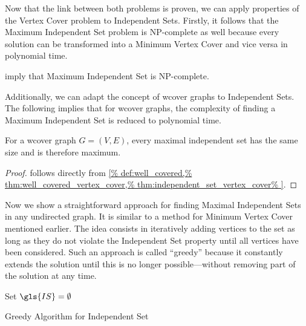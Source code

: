 Now that the link between both problems is proven, we can apply 
properties of the Vertex Cover problem to Independent Sets. Firstly,
it follows that the Maximum Independent Set problem is NP-complete as 
well because every solution can be transformed into a Minimum Vertex
Cover and vice versa in polynomial time.

\begin{theorem}
  \label{thm:maximum_independent_set_complexity}
   imply that Maximum Independent Set
  is NP-complete.
\end{theorem}

Additionally, we can adapt the concept of \gls{wcover} graphs to
Independent Sets. The following
 implies that for
\gls{wcover} graphs, the complexity of finding a Maximum Independent
Set is reduced to polynomial time.

\begin{theorem}
  \label{thm:well_covered_independent_set}
  For a \gls{wcover} graph \(G=(V,E)\), every maximal independent set
  has the same size and is therefore maximum.
  \begin{proof}
   follows directly from
  \cref{%
    def:well_covered,%
    thm:well_covered_vertex_cover,%
    thm:independent_set_vertex_cover%
  }.
  \end{proof}
\end{theorem}

Now we show a straightforward approach for finding Maximal Independent
Sets in any undirected graph. It is similar to a method for Minimum
Vertex Cover mentioned earlier. The idea consists in iteratively
adding vertices to the set as long as they do not violate the
Independent Set property until all vertices have been considered. Such
an approach is called ``greedy'' because it constantly extends the
solution until this is no longer possible---without removing part of
the solution at any time.

\begin{algorithm}
  \DontPrintSemicolon
  
  
  Set \(\gls{IS} = \emptyset\) \;
  \caption{\label{alg:greedy_independent_set}Greedy Algorithm for Independent Set}
\end{algorithm}

